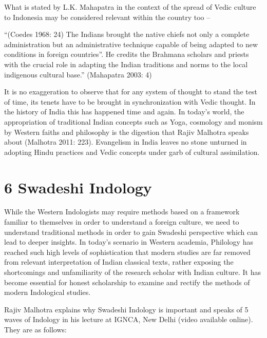 What is stated by L.K. Mahapatra in the context of the spread of Vedic culture to Indonesia may be considered relevant within the country too –

\begin{myquote}
“(Coedes 1968: 24) The Indians brought the native chiefs not only a complete administration but an administrative technique capable of being adapted to new conditions in foreign countries”. He credits the Brahmana scholars and priests with the crucial role in adapting the Indian traditions and norms to the local indigenous cultural base.” (Mahapatra 2003: 4)
\end{myquote}

It is no exaggeration to observe that for any system of thought to stand the test of time, its tenets have to be brought in synchronization with Vedic thought. In the history of India this has happened time and again. In today's world, the appropriation of traditional Indian concepts such as Yoga, cosmology and monism by Western faiths and philosophy is the digestion that Rajiv Malhotra speaks about (Malhotra 2011: 223). Evangelism in India leaves no stone unturned in adopting Hindu practices and Vedic concepts under garb of cultural assimilation.


\section*{6 Swadeshi Indology}

While the Western Indologists may require methods based on a framework familiar to themselves in order to understand a foreign culture, we need to understand traditional methods in order to gain Swadeshi perspective which can lead to deeper insights. In today’s scenario in Western academia, Philology has reached such high levels of sophistication that modern studies are far removed from relevant interpretation of Indian classical texts, rather exposing the shortcomings and unfamiliarity of the research scholar with Indian culture. It has become essential for honest scholarship to examine and rectify the methods of modern Indological studies.

Rajiv Malhotra explains why Swadeshi Indology is important and speaks of 5 waves of Indology in his lecture at IGNCA, New Delhi (video available online). They are as follows:


